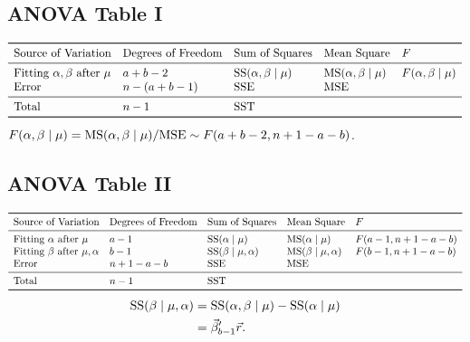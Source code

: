 \subsection*{ANOVA Table I}
\[ \begin{array}{lllll}
        \toprule
        \text{Source of Variation}                   & \text{Degrees of Freedom} & \text{Sum of Squares}           & \text{Mean Square}              & F                       \\
        \midrule
        \text{Fitting }\alpha,\beta\text{ after }\mu & a+b-2                     & \text{SS}(\alpha,\beta\mid \mu) & \text{MS}(\alpha,\beta\mid \mu) & F(\alpha,\beta\mid \mu) \\
        \text{Error}                                 & n-(a+b-1)                 & \SSE                            & \MSE                                                      \\
        \midrule
        \text{Total}                                 & n-1                       & \SST                                                                                        \\
        \bottomrule
    \end{array} \]
$ F(\alpha,\beta\mid \mu)=\text{MS}(\alpha,\beta\mid \mu)/\text{MSE}\sim F(a+b-2,n+1-a-b) $.
\subsection*{ANOVA Table II}
\[ \begin{array}{lllll}
        \toprule
        \text{Source of Variation}                    & \text{Degrees of Freedom} & \text{Sum of Squares}           & \text{Mean Square}              & F              \\
        \midrule
        \text{Fitting }\alpha\text{ after }\mu        & a-1                       & \text{SS}(\alpha\mid \mu)       & \text{MS}(\alpha\mid \mu)       & F(a-1,n+1-a-b) \\
        \text{Fitting }\beta \text{ after }\mu,\alpha & b-1                       & \text{SS}(\beta\mid \mu,\alpha) & \text{MS}(\beta\mid \mu,\alpha) & F(b-1,n+1-a-b) \\
        \text{Error}                                  & n+1-a-b                   & \SSE                            & \MSE                                             \\
        \midrule
        \text{Total}                                  & n-1                       & \SST                                                                               \\
        \bottomrule
    \end{array} \]
\begin{align*}
    \text{SS}(\beta\mid \mu,\alpha)
     & =\text{SS}(\alpha,\beta\mid \mu)-\text{SS}(\alpha\mid \mu) \\
     & =\vec{\beta}_{b-1}'\vec{r}.
\end{align*}
